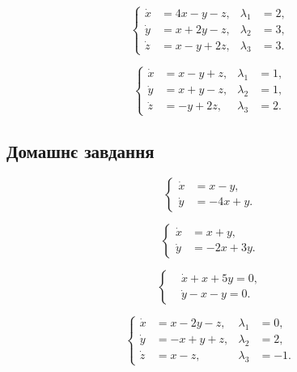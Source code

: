 \begin{problem}
	\[ \left\{ \begin{aligned} \dot x &= 4 x - y - z, & \lambda_1 &= 2, \\ \dot y &= x + 2 y - z, & \lambda_2 &= 3, \\ \dot z &= x - y + 2 z, & \lambda_3 &= 3. \end{aligned} \right. \]
\end{problem}

\begin{problem}
	\[ \left\{ \begin{aligned} \dot x &= x - y + z, & \lambda_1 &= 1, \\ \dot y &= x + y - z, & \lambda_2 &= 1, \\ \dot z &= - y + 2 z, & \lambda_3 &= 2. \end{aligned} \right. \]
\end{problem}

\subsection*{Домашнє завдання}

\begin{problem}
	\[ \left\{ \begin{aligned} \dot x &= x - y, \\ \dot y &= - 4 x + y. \end{aligned} \right. \]
\end{problem}

\begin{problem}
	\[ \left\{ \begin{aligned} \dot x &= x + y, \\ \dot y &= - 2 x + 3 y. \end{aligned} \right. \]
\end{problem}

\begin{problem}
	\[ \left\{ \begin{aligned} & \dot x + x + 5 y = 0, \\ & \dot y - x - y = 0. \end{aligned} \right. \]
\end{problem}

\begin{problem}
	\[ \left\{ \begin{aligned} \dot x &= x - 2 y - z, & \lambda_1 &= 0, \\ \dot y &= - x + y + z, & \lambda_2 &= 2, \\ \dot z &= x - z, & \lambda_3 &= - 1. \end{aligned} \right. \]
\end{problem}

